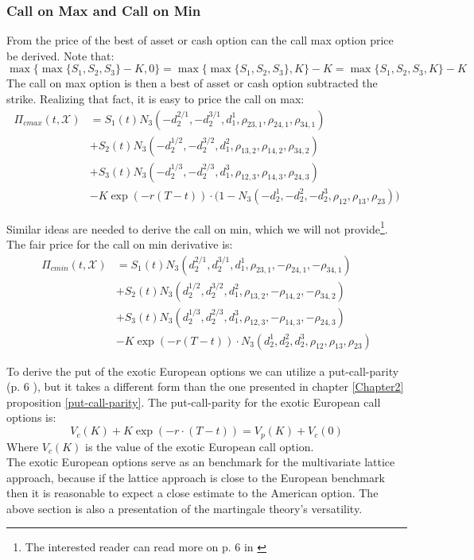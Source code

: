 \subsubsection{Call on Max and Call on Min}
From the price of the best of asset or cash option can the call max option price be derived. Note that:
$$\max\{\max\{ S_1,S_2,S_3 \} - K, 0\}=\max\{\max\{ S_1,S_2,S_3 \}, K\} - K = \max\{ S_1,S_2,S_3,K \} - K$$
The call on max option is then a best of asset or cash option subtracted the strike. Realizing that fact, it is easy to price the call on max:
\begin{equation*}\label{callMax}
\begin{split}
\Pi_{cmax}(t,\mathcal{X})&=S_1(t) N_3(-d_2^{2/1},-d_2^{3/1},d_1^{1}, \rho_{23,1}, \rho_{24,1}, \rho_{34,1}) \\
&+S_2(t) N_3(-d_2^{1/2},-d_2^{3/2},d_1^{2}, \rho_{13,2}, \rho_{14,2}, \rho_{34,2})\\
&+S_3(t) N_3(-d_2^{1/3},-d_2^{2/3},d_1^{3}, \rho_{12,3}, \rho_{14,3}, \rho_{24,3}) \\
&-K \exp(-r(T-t)) \cdot\bigg(1 - N_3(-d_2^1,-d_2^2,-d_2^3, \rho_{12}, \rho_{13}, \rho_{23})\bigg)
\end{split}
\end{equation*}

Similar ideas are needed to derive the call on min, which we will not provide\footnote{The interested reader can read more on p. 6 in \parencite{Ouwehand2006}}. The fair price for the call on min derivative is:
\begin{equation*}\label{callMin}
\begin{split}
\Pi_{cmin}(t,\mathcal{X})&=S_1(t) N_3(d_2^{2/1},d_2^{3/1},d_1^{1}, \rho_{23,1}, -\rho_{24,1}, -\rho_{34,1}) \\
&+S_2(t) N_3(d_2^{1/2},d_2^{3/2},d_1^{2}, \rho_{13,2}, -\rho_{14,2}, -\rho_{34,2})\\
&+S_3(t) N_3(d_2^{1/3},d_2^{2/3},d_1^{3}, \rho_{12,3}, -\rho_{14,3}, -\rho_{24,3}) \\
&-K \exp(-r(T-t)) \cdot N_3(d_2^1,d_2^2,d_2^3, \rho_{12}, \rho_{13}, \rho_{23})
\end{split}
\end{equation*}

To derive the put of the exotic European options we can utilize a put-call-parity (p. 6 \parencite{Ouwehand2006}), but it takes a different form than the one presented in chapter \ref{Chapter2} proposition \ref{put-call-parity}. The put-call-parity for the exotic European call options is:
\begin{equation*}\label{putMin}
V_c(K)+K\exp(-r\cdot (T-t)) = V_p(K)+V_c(0)
\end{equation*}
Where $V_c(K)$ is the value of the exotic European call option.\\

The exotic European options serve as an benchmark for the multivariate lattice approach, because if the lattice approach is close to the European benchmark then it is reasonable to expect a close estimate to the American option. The above section is also a presentation of the martingale theory's versatility. 



